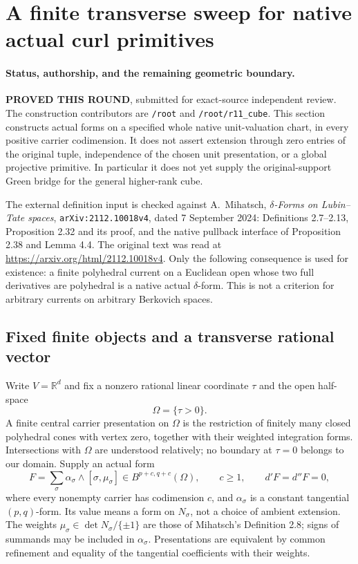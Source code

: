 \section{A finite transverse sweep for native actual curl primitives}
\label{sec:r11-finite-native-sweep}

\paragraph{Status, authorship, and the remaining geometric boundary.}
\textbf{PROVED THIS ROUND}, submitted for exact-source independent review.
The construction contributors are \texttt{/root} and
\texttt{/root/r11\_cube}.  This section constructs actual forms on a
specified whole native unit-valuation chart, in every positive carrier
codimension.  It does not assert extension through zero entries of the
original tuple, independence of the chosen unit presentation, or a
global projective primitive.  In particular it does not yet supply the
original-support Green bridge for the general higher-rank cube.

The external definition input is checked against A.~Mihatsch,
\emph{$\delta$-Forms on Lubin--Tate spaces},
\texttt{arXiv:2112.10018v4}, dated 7 September 2024:
Definitions 2.7--2.13, Proposition 2.32 and its proof, and the native
pullback interface of Proposition 2.38 and Lemma 4.4.
The original text was read at
\url{https://arxiv.org/html/2112.10018v4}.
Only the following consequence is used for existence: a finite
polyhedral current on a Euclidean open whose two full derivatives are
polyhedral is a native actual $\delta$-form.  This is not a criterion
for arbitrary currents on arbitrary Berkovich spaces.

\subsection{Fixed finite objects and a transverse rational vector}

Write $V=\mathbb R^d$ and fix a nonzero rational linear coordinate
$\tau$ and the open half-space
\[
                         \Omega=\{\tau>0\}.
 \tag{SWP1}
\]
A finite central carrier presentation on $\Omega$ is the restriction
of finitely many closed polyhedral cones with vertex zero, together
with their weighted integration forms.  Intersections with $\Omega$
are understood relatively; no boundary at $\tau=0$ belongs to our
domain.  Supply an actual form
\[
 F=\sum_{\sigma}\alpha_\sigma\wedge[\sigma,\mu_\sigma]
       \in B^{p+c,q+c}(\Omega),\qquad c\ge1,
       \qquad d'F=d''F=0,
 \tag{SWP2}
\]
where every nonempty carrier has codimension $c$, and
$\alpha_\sigma$ is a constant tangential $(p,q)$-form.  Its value
means a form on $N_\sigma$, not a choice of ambient extension.
The weights $\mu_\sigma\in\det N_\sigma/\{\pm1\}$ are those
of Mihatsch's Definition 2.8; signs of summands may be included in
$\alpha_\sigma$.  Presentations are equivalent by common refinement
and equality of the tangential coefficients with their weights.

